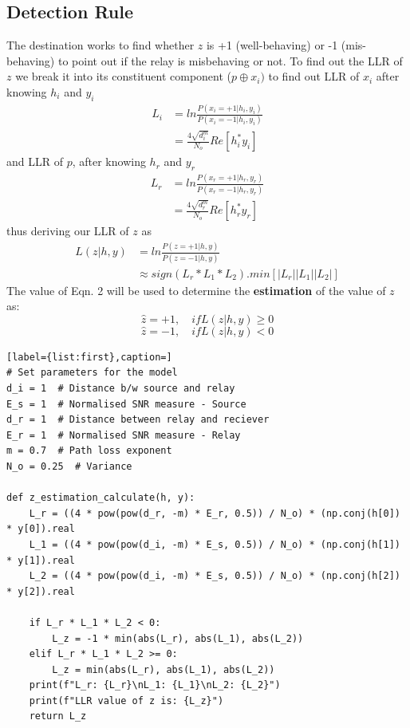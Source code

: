 \documentclass[conference]{IEEEtran}
\begin{document}
\subsection{Detection Rule}
The destination works to find whether $z$ is +1 (well-behaving) or -1 (mis-behaving) to point out if the relay is misbehaving or not. To find out the LLR of $z$ we break it into its constituent component ($p\oplus x_i)$ to find out
\newline LLR of $x_i$ after knowing $h_i$ and $y_i$
\[
\begin{split}
L_i & = ln\frac{P(x_i=+1|h_i,y_i)} {P(x_i=-1|h_i,y_i)} \\
 & = \frac{4\sqrt{d_i^m}}{N_o} Re[h_i^*y_i]
\end{split}
\]
and LLR of $p$, after knowing $h_r$ and $y_r$
\[
\begin{split}
L_r & = ln\frac{P(x_r=+1|h_r,y_r)} {P(x_r=-1|h_r,y_r)} \\
 & = \frac{4\sqrt{d_r^m}}{N_o} Re[h_r^*y_r]
\end{split}
\]
thus deriving our LLR of $z$ as
\begin{equation}
\begin{split}
L(z|h,y)& = ln\frac{P(z=+1|h,y)} {P(z=-1|h,y)} \\
 & \approx sign(L_r*L_1*L_2).min[|L_r||L_1||L_2|] 
\end{split}
\end{equation}
The value of Eqn. 2 will be used to determine the \textbf{estimation} of the value of $z$ as:
\[\hat{z}=+1, \quad if L(z|h,y)\geq 0\]
\[\hat{z}=-1, \quad if L(z|h,y)< 0\]
\begin{lstlisting}[label={list:first},caption=]
# Set parameters for the model
d_i = 1  # Distance b/w source and relay
E_s = 1  # Normalised SNR measure - Source
d_r = 1  # Distance between relay and reciever
E_r = 1  # Normalised SNR measure - Relay
m = 0.7  # Path loss exponent
N_o = 0.25  # Variance

def z_estimation_calculate(h, y):
    L_r = ((4 * pow(pow(d_r, -m) * E_r, 0.5)) / N_o) * (np.conj(h[0]) * y[0]).real
    L_1 = ((4 * pow(pow(d_i, -m) * E_s, 0.5)) / N_o) * (np.conj(h[1]) * y[1]).real
    L_2 = ((4 * pow(pow(d_i, -m) * E_s, 0.5)) / N_o) * (np.conj(h[2]) * y[2]).real

    if L_r * L_1 * L_2 < 0:
        L_z = -1 * min(abs(L_r), abs(L_1), abs(L_2))
    elif L_r * L_1 * L_2 >= 0:
        L_z = min(abs(L_r), abs(L_1), abs(L_2))
    print(f"L_r: {L_r}\nL_1: {L_1}\nL_2: {L_2}")
    print(f"LLR value of z is: {L_z}")
    return L_z
\end{lstlisting}
\end{document}
